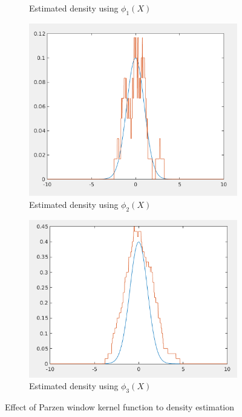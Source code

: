 \documentclass[12pt]{article}
\begin{document}
\begin{itemize}
\begin{figure}[h]
\begin{subfigure}{0.45\textwidth}
\caption{Estimated density using $\phi_1(X)$}
\end{subfigure}
\begin{subfigure}{0.45\textwidth}
\centering 
\includegraphics[scale=0.37]{Imgs/5-2.png}
\caption{Estimated density using $\phi_2(X)$}
\end{subfigure}
\begin{subfigure}{0.4\textwidth}
\centering 
\includegraphics[scale=0.4]{Imgs/5-3.png}
\caption{Estimated density using $\phi_3(X)$}
\end{subfigure}
\caption{Effect of Parzen window kernel function to density estimation}
\label{fig:5-1}
\end{figure}


\end{itemize}
\end{document}
